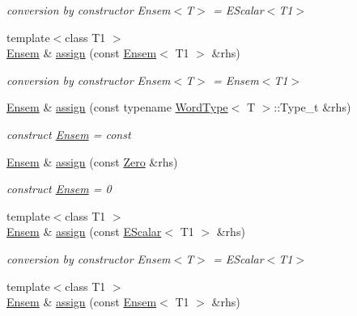 \begin{DoxyCompactItemize}
\begin{DoxyCompactList}\small\item\em conversion by constructor Ensem$<$\+T$>$ = E\+Scalar$<$\+T1$>$ \end{DoxyCompactList}\item 
{\footnotesize template$<$class T1 $>$ }\\\mbox{\hyperlink{classENSEM_1_1Ensem}{Ensem}} \& \mbox{\hyperlink{classENSEM_1_1Ensem_a43d968c090e5f6c518881cf7ff44d200}{assign}} (const \mbox{\hyperlink{classENSEM_1_1Ensem}{Ensem}}$<$ T1 $>$ \&rhs)
\begin{DoxyCompactList}\small\item\em conversion by constructor Ensem$<$\+T$>$ = Ensem$<$\+T1$>$ \end{DoxyCompactList}\item 
\mbox{\hyperlink{classENSEM_1_1Ensem}{Ensem}} \& \mbox{\hyperlink{classENSEM_1_1Ensem_ae31c239c3dc966eaad70ec90489f5476}{assign}} (const typename \mbox{\hyperlink{structENSEM_1_1WordType}{Word\+Type}}$<$ T $>$\+::Type\+\_\+t \&rhs)
\begin{DoxyCompactList}\small\item\em construct \mbox{\hyperlink{classENSEM_1_1Ensem}{Ensem}} = const \end{DoxyCompactList}\item 
\mbox{\hyperlink{classENSEM_1_1Ensem}{Ensem}} \& \mbox{\hyperlink{classENSEM_1_1Ensem_a140d8bb94d07a0abfb2ad396df63c625}{assign}} (const \mbox{\hyperlink{structENSEM_1_1Zero}{Zero}} \&rhs)
\begin{DoxyCompactList}\small\item\em construct \mbox{\hyperlink{classENSEM_1_1Ensem}{Ensem}} = 0 \end{DoxyCompactList}\item 
{\footnotesize template$<$class T1 $>$ }\\\mbox{\hyperlink{classENSEM_1_1Ensem}{Ensem}} \& \mbox{\hyperlink{classENSEM_1_1Ensem_aa09448269bc5b72687905254739bf69a}{assign}} (const \mbox{\hyperlink{classENSEM_1_1EScalar}{E\+Scalar}}$<$ T1 $>$ \&rhs)
\begin{DoxyCompactList}\small\item\em conversion by constructor Ensem$<$\+T$>$ = E\+Scalar$<$\+T1$>$ \end{DoxyCompactList}\item 
{\footnotesize template$<$class T1 $>$ }\\\mbox{\hyperlink{classENSEM_1_1Ensem}{Ensem}} \& \mbox{\hyperlink{classENSEM_1_1Ensem_a43d968c090e5f6c518881cf7ff44d200}{assign}} (const \mbox{\hyperlink{classENSEM_1_1Ensem}{Ensem}}$<$ T1 $>$ \&rhs)

\end{DoxyCompactItemize}
